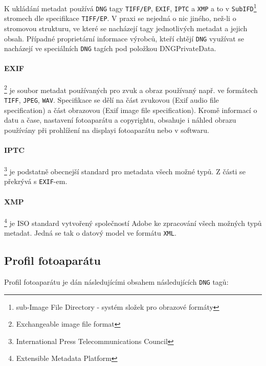 \documentclass[12pt,a4paper,titlepage,final]{report}
\begin{document}
K ukládání metadat používá \verb|DNG| tagy \verb|TIFF/EP|, \verb|EXIF|, \verb|IPTC| a \verb|XMP| a to v \verb|SubIFD|\footnote{sub-Image File Directory - systém složek pro obrazové formáty} stromech dle specifikace \verb|TIFF/EP|. V praxi se nejedná o nic jiného, než-li o stromovou strukturu, ve které se nacházejí tagy jednotlivých metadat a jejich obsah. Případné proprietární informace výrobců, kteří chtějí \verb|DNG| využívat se nacházejí ve speciálních \verb|DNG| tagích pod položkou DNGPrivateData.

\paragraph{EXIF}\footnote{Exchangeable image file format} je soubor metadat používaných pro zvuk a obraz používaný např. ve formátech \verb|TIFF|, \verb|JPEG|, \verb|WAV|. Specifikace se dělí na část zvukovou (Exif audio file specification) a část obrazovou (Exif image file specification). Kromě informací o datu a čase, nastavení fotoaparátu a copyrightu, obsahuje i náhled obrazu používány při prohlížení na displayi fotoaparátu nebo v softwaru.

\paragraph{IPTC}\footnote{International Press Telecommunications Council} je podstatně obecnejší standard pro metadata všech možné typů. Z části se překrývá s \verb|EXIF|-em.

\paragraph{XMP}\footnote{Extensible Metadata Platform} je ISO standard vytvořený společností Adobe ke zpracování všech možných typů metadat. Jedná se tak o datový model ve formátu \verb|XML|.

\subsection{Profil fotoaparátu}\label{subsec:profil-fotoaparatu}

Profil fotoaparátu je dán následujícími obsahem následujících \verb|DNG| tagů:
\end{document}
